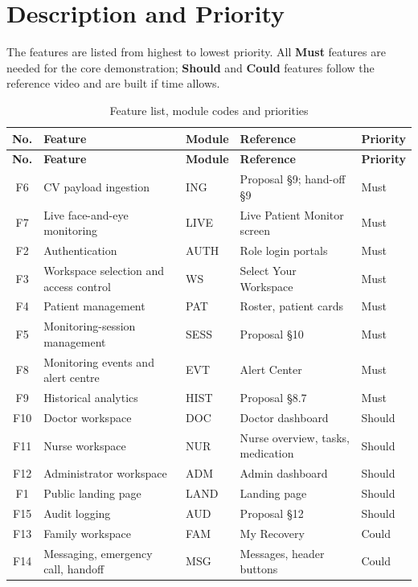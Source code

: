 \documentclass[a4paper,11pt]{scrreprt}
\begin{document}
\section{Description and Priority}\label{sec:features}
The features are listed from highest to lowest priority. All \textbf{Must} features are needed for the core demonstration; \textbf{Should} and \textbf{Could} features follow the reference video and are built if time allows.

\begin{longtable}{@{}c>{\raggedright\arraybackslash}p{4.6cm}l>{\raggedright\arraybackslash}p{4.3cm}>{\raggedright\arraybackslash}p{2.4cm}@{}}
\caption{Feature list, module codes and priorities}\label{tab:features}\\
\toprule \textbf{No.} & \textbf{Feature} & \textbf{Module} & \textbf{Reference} & \textbf{Priority}\\ \midrule \endfirsthead
\toprule \textbf{No.} & \textbf{Feature} & \textbf{Module} & \textbf{Reference} & \textbf{Priority}\\ \midrule \endhead
\bottomrule \endfoot
F6 & CV payload ingestion & ING & Proposal \S9; hand-off \S9 & Must\\
F7 & Live face-and-eye monitoring & LIVE & Live Patient Monitor screen & Must\\
F2 & Authentication & AUTH & Role login portals & Must\\
F3 & Workspace selection and access control & WS & Select Your Workspace & Must\\
F4 & Patient management & PAT & Roster, patient cards & Must\\
F5 & Monitoring-session management & SESS & Proposal \S10 & Must\\
F8 & Monitoring events and alert centre & EVT & Alert Center & Must\\
F9 & Historical analytics & HIST & Proposal \S8.7 & Must\\
F10 & Doctor workspace & DOC & Doctor dashboard & Should\\
F11 & Nurse workspace & NUR & Nurse overview, tasks, medication & Should\\
F12 & Administrator workspace & ADM & Admin dashboard & Should\\
F1 & Public landing page & LAND & Landing page & Should\\
F15 & Audit logging & AUD & Proposal \S12 & Should\\
F13 & Family workspace & FAM & My Recovery & Could\\
F14 & Messaging, emergency call, handoff & MSG & Messages, header buttons & Could\\
\end{longtable}
\end{document}
